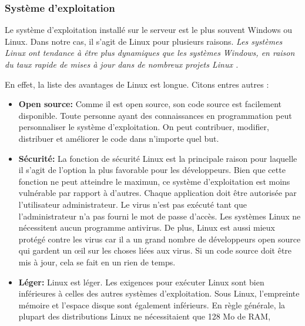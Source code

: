         \subsubsection{Système d'exploitation}
        Le système d'exploitation installé sur le serveur est le plus souvent Windows ou Linux.
        Dans notre cas, il s'agit de Linux pour plusieurs raisons.
        \textit{Les systèmes Linux ont tendance à être plus dynamiques que les 
        systèmes Windows, en raison du taux rapide de mises à jour  
        dans de nombreux projets Linux \cite{ovadia2014linux}.}
        \par
        En effet, la liste des avantages de Linux 
        est longue. Citons entres autres \cite{advlinux} :
        \begin{itemize}
                \item \textbf{Open source: }
                Comme il est open source, son code source est facilement disponible. 
                Toute personne ayant des connaissances en programmation peut personnaliser 
                le système d'exploitation. On peut contribuer, modifier, distribuer et 
                améliorer le code dans n'importe quel but.
                \item \textbf{Sécurité: }
                La fonction de sécurité Linux est la principale raison pour laquelle il s'agit de  
                l'option la plus favorable pour les développeurs. Bien que cette fonction ne peut atteindre 
                le maximun, ce système d'exploitation est moins vulnérable par rapport à
                 d'autres. Chaque application doit 
                être autorisée par l'utilisateur administrateur. Le virus n'est pas exécuté 
                tant que l'administrateur n'a pas fourni le mot de passe d'accès. Les systèmes 
                Linux ne nécessitent aucun programme antivirus.
                De plus, Linux est aussi mieux protégé contre les virus car il a un grand 
                nombre de développeurs open source qui gardent un œil sur les choses liées aux 
                virus. Si un code source doit être mis à jour, cela se fait en un rien de temps.
                \item \textbf{Léger: }
                Linux est léger. Les exigences pour exécuter Linux sont bien inférieures à 
                celles des autres systèmes d'exploitation. Sous Linux, l'empreinte mémoire et 
                l'espace disque sont également inférieurs. En règle générale, 
                la plupart des distributions Linux ne nécessitaient que 128 Mo de RAM, 

\end{itemize}
